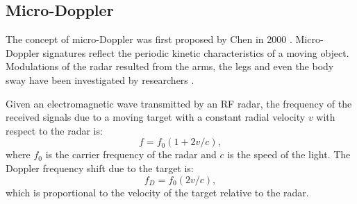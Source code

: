 \subsection{Micro-Doppler}
The concept of micro-Doppler was first proposed by Chen in 2000 \cite{tahmoush2009remote}. Micro-Doppler signatures reflect the periodic kinetic characteristics of a moving object. Modulations of the radar resulted from the arms, the legs and even the body sway have been investigated by researchers \cite{ram2008simulation,tahmoush2009radar,zhang2007acoustic}. 

Given an electromagnetic wave transmitted by an RF radar, the frequency of the received signals due to a moving target with a constant radial velocity $v$ with respect to the radar is:
\begin{equation}
f=f_0 (1+2v/c),
\end{equation}
where $f_0$ is the carrier frequency of the radar and  $c$ is the speed of the light. The Doppler frequency shift due to the target is:
\begin{equation}
f_D=f_0  (2v/c),
\end{equation}
which is proportional to the velocity of the target relative to the radar.

